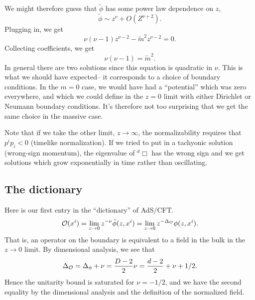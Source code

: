 We might therefore guess that $\tilde \phi$ has some power law dependence on $z$,
\begin{equation}
    \tilde \phi \sim z^\nu + O(Z^{\nu+2}).
\end{equation}
Plugging in, we get
\begin{equation}
    \nu(\nu-1)z^{\nu-2} - \tilde m^2 z^{\nu-2} =0.
\end{equation}
Collecting coefficients, we get
\begin{equation}
    \nu(\nu-1) = \tilde m^2.
\end{equation}
In general there are two solutions since this equation is quadratic in $\nu$. This is what we should have expected-- it corresponds to a choice of boundary conditions. In the $m=0$ case, we would have had a ``potential'' which was zero everywhere, and which we could define in the $z=0$ limit with either Dirichlet or Neumann boundary conditions. It's therefore not too surprising that we get the same choice in the massive case.

Note that if we take the other limit, $z\to \infty$, the normalizability requires that $p^i p_i <0$ (timelike normalization). If we tried to put in a tachyonic solution (wrong-sign momentum), the eigenvalue of ${}^{d}\Box$ has the wrong sign and we get solutions which grow exponentially in time rather than oscillating.

\subsection*{The dictionary}
Here is our first entry in the ``dictionary'' of AdS/CFT.
\begin{equation}
    \mathcal O(x^i) = \lim_{z\to 0} z^{-\nu} \tilde \phi(z,x^i)= \lim_{z\to 0} z^{-\Delta_\mathcal O}\phi(z,x^i).
\end{equation}
That is, an operator on the boundary is equivalent to a field in the bulk in the $z\to 0$ limit. By dimensional analysis, we see that 
\begin{equation}
    \Delta_{\mathcal O}=\Delta_\phi +\nu =\frac{D-2}{2} \nu = \frac{d-2}{2} + \nu + 1/2.
\end{equation}
Hence the unitarity bound is saturated for $\nu=-1/2$, and we have the second equality by the dimensional analysis and the definition of the normalized field.

